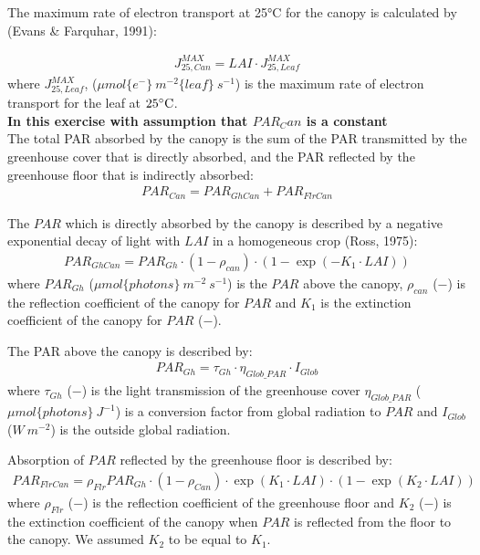 \documentclass[a4paper]{article}
\numberwithin{equation}{section}
\begin{document}
The maximum rate of electron transport at 25°C for the canopy is calculated by (Evans \& Farquhar, 1991):

\begin{align}
  J^{MAX}_{25,Can} = LAI \cdot J^{MAX}_{25,Leaf}
\end{align}
where \(J^{MAX}_{25,Leaf}\), (\(\mu mol\{e^-\}\ m^{-2}\{leaf\}\ s^{-1}\)) is the maximum rate of electron transport for the leaf at \(25 \celsius\).\\


\textbf{In this exercise with assumption that \(PAR_Can\) is a constant}\\
The total PAR absorbed by the canopy is the sum of the PAR transmitted by the greenhouse
cover that is directly absorbed, and the PAR reflected by the greenhouse floor that is
indirectly absorbed:
\begin{align}
  PAR_{Can} = PAR_{GhCan} + PAR_{FlrCan}
\end{align}

The \(PAR\) which is directly absorbed by the canopy is described by a negative exponential decay of light with \(LAI\) in a homogeneous crop (Ross, 1975):
\begin{align}
  PAR_{GhCan} = PAR_{Gh}\cdot (1-\rho_{can})\cdot(1 - \exp \left(-K_1\cdot LAI\right))
\end{align}
where \(PAR_{Gh}\) (\(\mu mol \{photons\}\ m^{-2}\ s^{-1}\)) is the \(PAR\) above the canopy, \(\rho_{can}\) (\(-\)) is the reflection coefficient of the canopy for \(PAR\) and \(K_1\) is the extinction coefficient of the canopy for \(PAR\) (\(-\)).

The PAR above the canopy is described by:
\begin{align}
  PAR_{Gh} = \tau_{Gh} \cdot \eta_{Glob\_PAR}\cdot I_{Glob}
\end{align}
where \(\tau_{Gh}\) (\(-\)) is the light transmission of the greenhouse cover \(\eta_{Glob\_PAR}\) (\(\mu mol\{photons\}\ J^{-1}\)) is a conversion factor from global radiation to \(PAR\) and \(I_{Glob}\) (\(W\ m^{-2}\)) is the outside global radiation.

Absorption of \(PAR\) reflected by the greenhouse floor is described by:
\begin{align}
  PAR_{FlrCan} = \rho_{Flr}PAR_{Gh}\cdot (1-\rho_{Can})\cdot \exp \left(K_1\cdot LAI\right) \cdot (1 - \exp \left(K_2\cdot LAI\right))
\end{align}
where \(\rho_{Flr}\) (\(-\)) is the reflection coefficient of the greenhouse floor and \(K_2\) (\(-\)) is the extinction coefficient of the canopy when \(PAR\) is reflected from the floor to the canopy. We assumed \(K_2\) to be equal to \(K_1\).
\end{document}
